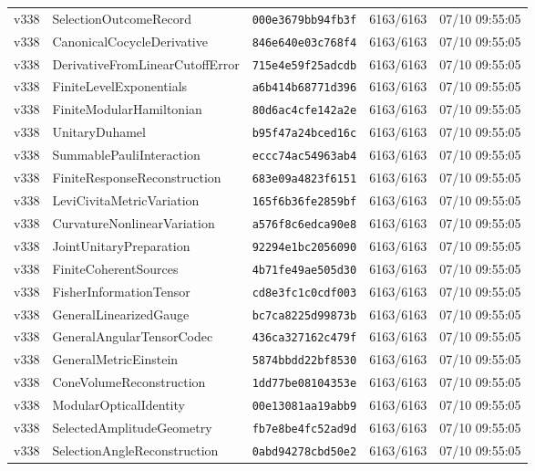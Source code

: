 \documentclass[11pt]{article}
\theoremstyle{definition}\newtheorem{deriv}{Derivação}
\begin{document}
{\begin{longtable}{@{}lllll@{}}
v338 & SelectionOutcomeRecord & \texttt{000e3679bb94fb3f} & 6163/6163 & 07/10 09:55:05 \\
v338 & CanonicalCocycleDerivative & \texttt{846e640e03c768f4} & 6163/6163 & 07/10 09:55:05 \\
v338 & DerivativeFromLinearCutoffError & \texttt{715e4e59f25adcdb} & 6163/6163 & 07/10 09:55:05 \\
v338 & FiniteLevelExponentials & \texttt{a6b414b68771d396} & 6163/6163 & 07/10 09:55:05 \\
v338 & FiniteModularHamiltonian & \texttt{80d6ac4cfe142a2e} & 6163/6163 & 07/10 09:55:05 \\
v338 & UnitaryDuhamel & \texttt{b95f47a24bced16c} & 6163/6163 & 07/10 09:55:05 \\
v338 & SummablePauliInteraction & \texttt{eccc74ac54963ab4} & 6163/6163 & 07/10 09:55:05 \\
v338 & FiniteResponseReconstruction & \texttt{683e09a4823f6151} & 6163/6163 & 07/10 09:55:05 \\
v338 & LeviCivitaMetricVariation & \texttt{165f6b36fe2859bf} & 6163/6163 & 07/10 09:55:05 \\
v338 & CurvatureNonlinearVariation & \texttt{a576f8c6edca90e8} & 6163/6163 & 07/10 09:55:05 \\
v338 & JointUnitaryPreparation & \texttt{92294e1bc2056090} & 6163/6163 & 07/10 09:55:05 \\
v338 & FiniteCoherentSources & \texttt{4b71fe49ae505d30} & 6163/6163 & 07/10 09:55:05 \\
v338 & FisherInformationTensor & \texttt{cd8e3fc1c0cdf003} & 6163/6163 & 07/10 09:55:05 \\
v338 & GeneralLinearizedGauge & \texttt{bc7ca8225d99873b} & 6163/6163 & 07/10 09:55:05 \\
v338 & GeneralAngularTensorCodec & \texttt{436ca327162c479f} & 6163/6163 & 07/10 09:55:05 \\
v338 & GeneralMetricEinstein & \texttt{5874bbdd22bf8530} & 6163/6163 & 07/10 09:55:05 \\
v338 & ConeVolumeReconstruction & \texttt{1dd77be08104353e} & 6163/6163 & 07/10 09:55:05 \\
v338 & ModularOpticalIdentity & \texttt{00e13081aa19abb9} & 6163/6163 & 07/10 09:55:05 \\
v338 & SelectedAmplitudeGeometry & \texttt{fb7e8be4fc52ad9d} & 6163/6163 & 07/10 09:55:05 \\
v338 & SelectionAngleReconstruction & \texttt{0abd94278cbd50e2} & 6163/6163 & 07/10 09:55:05 \\

\end{longtable}}
\end{document}
